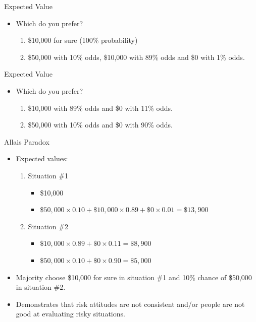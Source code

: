\begin{frame}{Expected Value}
	\begin{itemize}
		\item Which do you prefer?
		\begin{enumerate}
			\item \$10,000 for sure (100\% probability)
			\item \$50,000 with 10\% odds, \$10,000 with 89\% odds and \$0 with 1\% odds.
		\end{enumerate}
	\end{itemize}
\end{frame}

\begin{frame}{Expected Value}
	\begin{itemize}
		\item Which do you prefer?
		\begin{enumerate}
			\item \$10,000 with 89\% odds and \$0 with 11\% odds.
			\item \$50,000 with 10\% odds and \$0 with 90\% odds.
		\end{enumerate}
	\end{itemize}
\end{frame}

\begin{frame}{Allais Paradox}
	\begin{itemize}
		\item Expected values:
		\begin{enumerate}
			\item Situation \#1
			\begin{itemize}
				\item \$10,000
				\item $ \$50,000 \times 0.10 + \$10,000 \times 0.89 + \$0 \times 0.01 = \$13,900 $ 
			\end{itemize}
			\item Situation \#2
			\begin{itemize}
				\item $ \$10,000 \times 0.89 + \$0 \times 0.11 = \$8,900 $
				\item $ \$50,000 \times 0.10 + \$0 \times 0.90 = \$5,000 $ 
			\end{itemize}
		\end{enumerate}
		\item Majority choose \$10,000 for sure in situation \#1 and 10\% chance of \$50,000 in situation \#2.
		\item Demonstrates that risk attitudes are not consistent and/or people are not good at evaluating risky situations.
	\end{itemize}
\end{frame}

